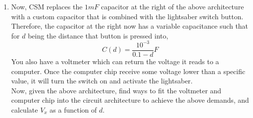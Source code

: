 \begin{enumerate}
{        At last, combining the above cases, we attain the same sum voltage:
        \[V_x = \frac{C_1 V_1 + C_2 V_2}{C_1 + C_2}\]
        And we would then just substitute both capacitors with $1mF$.
    
    }
    
    \item {
        Now, CSM replaces the $1mF$ capacitor at the right of the above architecture with a custom capacitor that is combined with the lightsaber switch button. Therefore, the capacitor at the right now has a variable capacitance such that for $d$ being the distance that button is pressed into,
        \[C(d) = \frac{{10}^{-3}}{0.1 - d} F\]
        You also have a voltmeter which can return the voltage it reads to a computer. Once the computer chip receive some voltage lower than a specific value, it will turn the switch on and activate the lightsaber. \\
        Now, given the above architecture, find ways to fit the voltmeter and computer chip into the circuit architecture to achieve the above demands, and calculate $V_x$ as a function of $d$.
    
    }
\end{enumerate}
